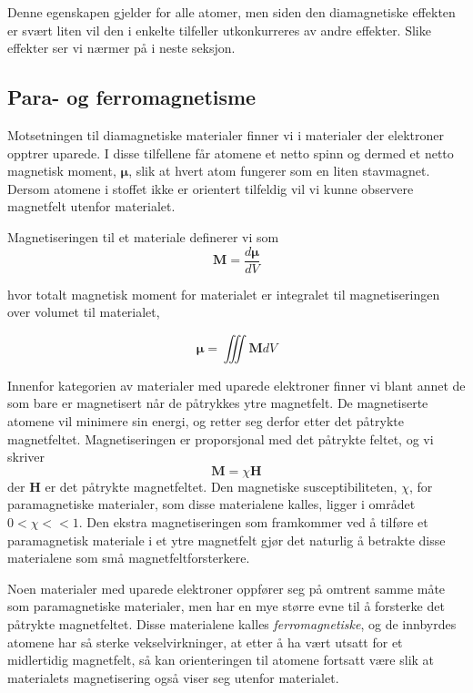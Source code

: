 \documentclass[a4paper,11pt, twocolumn]{article}
\begin{document}
Denne egenskapen gjelder for alle atomer, men siden den diamagnetiske effekten er svært liten vil den i enkelte tilfeller utkonkurreres av andre effekter. Slike effekter ser vi nærmer på i neste seksjon.

\subsection{Para- og ferromagnetisme}
Motsetningen til diamagnetiske materialer finner vi i materialer der elektroner opptrer uparede. I disse tilfellene får atomene et netto spinn og dermed et netto magnetisk moment, ${\boldsymbol \mu}$, slik at hvert atom fungerer som en liten stavmagnet. Dersom atomene i stoffet ikke er orientert tilfeldig vil vi kunne observere magnetfelt utenfor materialet.

Magnetiseringen til et materiale definerer vi som
\begin{equation}
	\mathbf{M} = \frac{d {\boldsymbol \mu}}{dV}
	\label{eq:magnetization}
\end{equation}

hvor totalt magnetisk moment for materialet er integralet til magnetiseringen over volumet til materialet,

\begin{equation}
	{\boldsymbol \mu} = \iiint \mathbf{M}dV
	\label{eq:totalMoment}
\end{equation}

Innenfor kategorien av materialer med uparede elektroner finner vi blant annet de som bare er magnetisert når de påtrykkes ytre magnetfelt. De magnetiserte atomene vil minimere sin energi, og retter seg derfor etter det påtrykte magnetfeltet. Magnetiseringen er proporsjonal med det påtrykte feltet, og vi skriver 
\begin{equation}
	\mathbf{M} = \chi\mathbf{H}
	\label{eq:proposjonalitetPara}
\end{equation}
der $\mathbf{H}$ er det påtrykte magnetfeltet. Den magnetiske susceptibiliteten, $\chi$, for paramagnetiske materialer, som disse materialene kalles, ligger i området $0<\chi<<1$. Den ekstra magnetiseringen som framkommer ved å tilføre et paramagnetisk materiale i et ytre magnetfelt gjør det naturlig å betrakte disse materialene som små magnetfeltforsterkere.

Noen materialer med uparede elektroner oppfører seg på omtrent samme måte som paramagnetiske materialer, men har en mye større evne til å forsterke det påtrykte magnetfeltet. Disse materialene kalles \textit{ferromagnetiske}, og de innbyrdes atomene har så sterke vekselvirkninger, at etter å ha vært utsatt for et midlertidig magnetfelt, så kan orienteringen til atomene fortsatt være slik at materialets magnetisering også viser seg utenfor materialet. 
\end{document}
